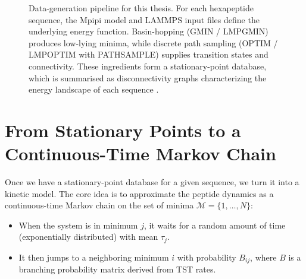 \begin{figure}[ht]
  \caption{Data-generation pipeline for this thesis. For each hexapeptide
  sequence, the Mpipi model and LAMMPS input files define the underlying
  energy function. Basin-hopping (GMIN / LMPGMIN) produces low-lying
  minima, while discrete path sampling (OPTIM / LMPOPTIM with PATHSAMPLE)
  supplies transition states and connectivity. These ingredients form a
  stationary-point database, which is summarised as disconnectivity
  graphs characterizing the energy landscape of each sequence
  \cite{Wales1998Archetypal,Nicy2024Mpipi}.}
  \label{fig:data-generation-disconnectivity}
\end{figure}



\section{From Stationary Points to a Continuous-Time Markov Chain}\label{sec:ktn}

Once we have a stationary-point database for a given sequence, we turn
it into a kinetic model. The core idea is to approximate the peptide
dynamics as a continuous-time Markov chain on the set of minima
$\mathcal{M} = \{1,\dots,N\}$:

\begin{itemize}
  \item When the system is in minimum $j$, it waits for a random amount
        of time (exponentially distributed) with mean $\tau_j$.
  \item It then jumps to a neighboring minimum $i$ with probability
        $B_{ij}$, where $B$ is a branching probability matrix derived
        from TST rates.
\end{itemize}

